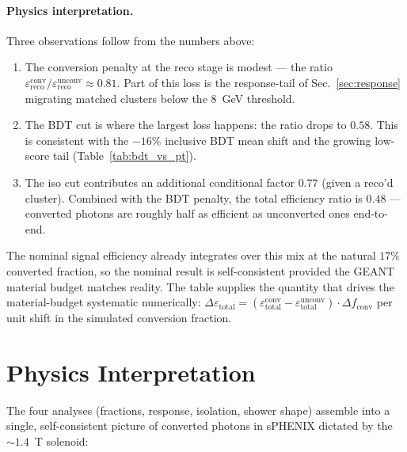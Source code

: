 \documentclass[11pt,a4paper]{article}
\begin{document}
\paragraph{Physics interpretation.}
Three observations follow from the numbers above:
%
\begin{enumerate}
  \item The conversion penalty at the reco stage is modest ---
  the ratio $\varepsilon_{\mathrm{reco}}^{\mathrm{conv}}/
  \varepsilon_{\mathrm{reco}}^{\mathrm{unconv}}\approx 0.81$.
  Part of this loss is the response-tail of Sec.~\ref{sec:response}
  migrating matched clusters below the 8~GeV threshold.
  \item The BDT cut is where the largest loss happens: the ratio drops
  to $0.58$. This is consistent with the $-16\%$ inclusive
  BDT mean shift and the growing low-score tail (Table~\ref{tab:bdt_vs_pt}).
  \item The iso cut contributes an additional conditional factor
  $0.77$ (given a reco'd cluster). Combined with the BDT
  penalty, the total efficiency ratio is $0.48$ --- converted
  photons are roughly half as efficient as unconverted ones end-to-end.
\end{enumerate}
%
The nominal signal efficiency already integrates over this mix at the
natural $17\%$ converted fraction, so the nominal result is
self-consistent provided the GEANT material budget matches reality. The
table supplies the quantity that drives the material-budget systematic
numerically: $\Delta\varepsilon_{\mathrm{total}} =
(\varepsilon_{\mathrm{total}}^{\mathrm{conv}}-
\varepsilon_{\mathrm{total}}^{\mathrm{unconv}})\cdot\Delta f_{\mathrm{conv}}$
per unit shift in the simulated conversion fraction.


\section{Physics Interpretation}
\label{sec:physics}

The four analyses (fractions, response, isolation, shower shape) assemble
into a single, self-consistent picture of converted photons in sPHENIX
dictated by the $\sim 1.4$~T solenoid:
\end{document}
